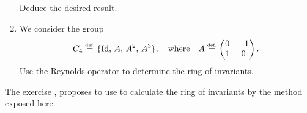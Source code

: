 \begin{exo}
\begin{enumerate}
\begin{equation*}
\end{equation*}
Deduce the desired result.
\item We consider the group
\begin{equation*}
C_4 \stackrel{\mbox{\upshape\tiny def.}}{=} \{\operatorname{Id}, \, A, \, A^2, \, A^3\}, \quad \text{where} \quad A \stackrel{\mbox{\upshape\tiny def.}}{=} \begin{pmatrix} 0 & -1 \\1 & 0 \end{pmatrix}.
\end{equation*}
Use the Reynolds operator to determine the ring of invariants.
\end{enumerate} The exercise , proposes to use \Maple{} to calculate the ring of invariants by the method exposed here.
\end{exo}
 
 
\begin{exo}
\label{exo-thm-molien}
 

\end{exo}
